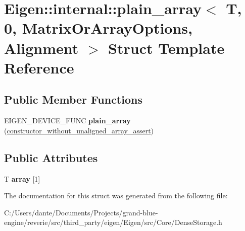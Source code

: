 \hypertarget{struct_eigen_1_1internal_1_1plain__array_3_01_t_00_010_00_01_matrix_or_array_options_00_01_alignment_01_4}{}\section{Eigen\+::internal\+::plain\+\_\+array$<$ T, 0, Matrix\+Or\+Array\+Options, Alignment $>$ Struct Template Reference}
\label{struct_eigen_1_1internal_1_1plain__array_3_01_t_00_010_00_01_matrix_or_array_options_00_01_alignment_01_4}
\subsection*{Public Member Functions}
\begin{DoxyCompactItemize}
\item 
\mbox{\label{struct_eigen_1_1internal_1_1plain__array_3_01_t_00_010_00_01_matrix_or_array_options_00_01_alignment_01_4_a2000037e51cb24ea3a7500bf94102cb2}} 
E\+I\+G\+E\+N\+\_\+\+D\+E\+V\+I\+C\+E\+\_\+\+F\+U\+NC {\bfseries plain\+\_\+array} (\mbox{\hyperlink{struct_eigen_1_1internal_1_1constructor__without__unaligned__array__assert}{constructor\+\_\+without\+\_\+unaligned\+\_\+array\+\_\+assert}})
\end{DoxyCompactItemize}
\subsection*{Public Attributes}
\begin{DoxyCompactItemize}
\item 
\mbox{\label{struct_eigen_1_1internal_1_1plain__array_3_01_t_00_010_00_01_matrix_or_array_options_00_01_alignment_01_4_ad489c4ae72bf6c85f436cee91d4c39b7}} 
T {\bfseries array} \mbox{[}1\mbox{]}
\end{DoxyCompactItemize}


The documentation for this struct was generated from the following file\+:\begin{DoxyCompactItemize}
\item 
C\+:/\+Users/dante/\+Documents/\+Projects/grand-\/blue-\/engine/reverie/src/third\+\_\+party/eigen/\+Eigen/src/\+Core/Dense\+Storage.\+h\end{DoxyCompactItemize}
